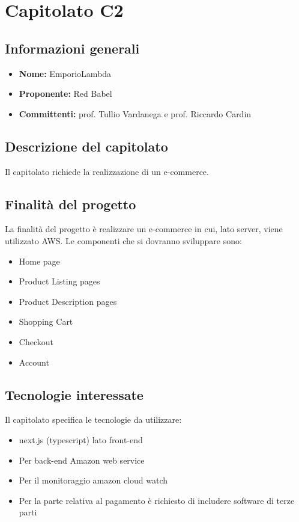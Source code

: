 \section{Capitolato C2}

\subsection{Informazioni generali}
\begin{itemize}
\item \textbf{Nome:} EmporioLambda
\item \textbf{Proponente:} Red Babel
\item \textbf{Committenti:} prof. Tullio Vardanega e prof. Riccardo Cardin
\end{itemize}

\subsection{Descrizione del capitolato}
Il capitolato richiede la realizzazione di un e-commerce.
\subsection{Finalità del progetto}
La finalità del progetto è realizzare un e-commerce in cui, lato server, viene utilizzato AWS. Le componenti che si dovranno sviluppare sono:
\begin{itemize}
\item Home page
\item Product Listing pages
\item Product Description pages
\item Shopping Cart
\item Checkout
\item Account
\end{itemize}

\subsection{Tecnologie interessate}
Il capitolato specifica le tecnologie da utilizzare:
\begin{itemize}
\item next.js (typescript) lato front-end
\item Per back-end Amazon web service
\item Per il monitoraggio amazon cloud watch
\item Per la parte relativa al pagamento è richiesto di includere software di terze parti
\end{itemize}

